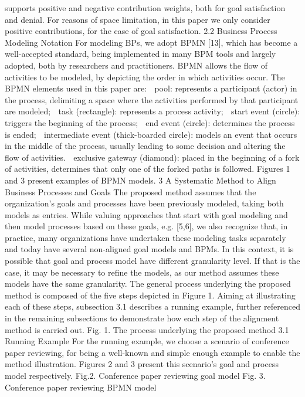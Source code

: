 supports positive and negative contribution weights, both for goal satisfaction and
denial. For reasons of space limitation, in this paper we only consider positive contributions, for the case of goal satisfaction.
2.2 Business Process Modeling Notation
For modeling BPs, we adopt BPMN [13], which has become a well-accepted standard, being implemented in many BPM tools and largely adopted, both by researchers
and practitioners. BPMN allows the flow of activities to be modeled, by depicting the
order in which activities occur. The BPMN elements used in this paper are:
 pool: represents a participant (actor) in the process, delimiting a space where
the activities performed by that participant are modeled;
 task (rectangle): represents a process activity;
 start event (circle): triggers the beginning of the process;
 end event (circle): determines the process is ended;
 intermediate event (thick-boarded circle): models an event that occurs in the
middle of the process, usually leading to some decision and altering the flow
of activities.
 exclusive gateway (diamond): placed in the beginning of a fork of activities,
determines that only one of the forked paths is followed.
Figures 1 and 3 present examples of BPMN models.
3 A Systematic Method to Align Business Processes and Goals
The proposed method assumes that the organization’s goals and processes have been
previously modeled, taking both models as entries. While valuing approaches that start
with goal modeling and then model processes based on these goals, e.g. [5,6], we also
recognize that, in practice, many organizations have undertaken these modeling tasks
separately and today have several non-aligned goal models and BPMs. In this context,
it is possible that goal and process model have different granularity level. If that is the
case, it may be necessary to refine the models, as our method assumes these models
have the same granularity. The general process underlying the proposed method is composed of the five steps depicted in Figure 1. Aiming at illustrating each of these steps,
subsection 3.1 describes a running example, further referenced in the remaining subsections to demonstrate how each step of the alignment method is carried out.
Fig. 1. The process underlying the proposed method
3.1 Running Example
For the running example, we choose a scenario of conference paper reviewing, for
being a well-known and simple enough example to enable the method illustration. Figures 2 and 3 present this scenario’s goal and process model respectively.
Fig.2. Conference paper reviewing goal model
Fig. 3. Conference paper reviewing BPMN model
